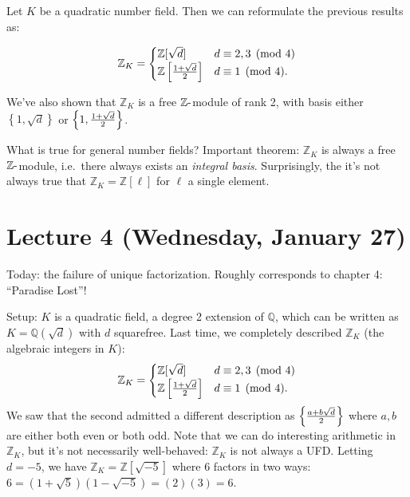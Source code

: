 \begin{remark}

Let \(K\) be a quadratic number field. Then we can reformulate the
previous results as:

\begin{align*}
{\mathbb{Z}}_K = 
\begin{cases}
{\mathbb{Z}}[ \sqrt{d} ] &  d \equiv 2,3 \pmod 4
\\
{\mathbb{Z}}\left[{1 + \sqrt{d} \over 2}\right] & d \equiv 1 \pmod 4.
\end{cases}
\end{align*}

We've also shown that \({\mathbb{Z}}_K\) is a free
\({\mathbb{Z}}{\hbox{-}}\)module of rank 2, with basis either
\(\left\{{ 1, \sqrt{d} }\right\}\) or
\(\left\{{ 1, {1 + \sqrt{d} \over 2 } }\right\}\).

\end{remark}

\begin{remark}

What is true for general number fields? Important theorem:
\({\mathbb{Z}}_K\) is always a free \({\mathbb{Z}}{\hbox{-}}\)module,
i.e.~there always exists an \emph{integral basis}. Surprisingly, the
it's not always true that \({\mathbb{Z}}_K = {\mathbb{Z}}[\ell]\) for
\(\ell\) a single element.

\end{remark}

\hypertarget{lecture-4-wednesday-january-27}{%
\section{Lecture 4 (Wednesday, January
27)}\label{lecture-4-wednesday-january-27}}

Today: the failure of unique factorization. Roughly corresponds to
chapter 4: ``Paradise Lost''!

Setup: \(K\) is a quadratic field, a degree 2 extension of
\({\mathbb{Q}}\), which can be written as \(K = {\mathbb{Q}}(\sqrt{d})\)
with \(d\) squarefree. Last time, we completely described
\({\mathbb{Z}}_K\) (the algebraic integers in \(K\)):
\begin{align*}
{\mathbb{Z}}_K = 
\begin{cases}
{\mathbb{Z}}[ \sqrt{d} ] &  d \equiv 2,3 \pmod 4
\\
{\mathbb{Z}}\left[{1 + \sqrt{d} \over 2}\right] & d \equiv 1 \pmod 4.
\end{cases}
\end{align*}
We saw that the second admitted a different description as
\(\left\{{ {a + b \sqrt{d} \over 2}}\right\}\) where \(a,b\) are either
both even or both odd. Note that we can do interesting arithmetic in
\({\mathbb{Z}}_K\), but it's not necessarily well-behaved:
\({\mathbb{Z}}_K\) is not always a UFD. Letting \(d=-5\), we have
\({\mathbb{Z}}_K = {\mathbb{Z}}[ \sqrt{-5} ]\) where \(6\) factors in
two ways: \(6 = (1 + \sqrt{5} )(1 - \sqrt{-5} ) = (2)(3) = 6\).

